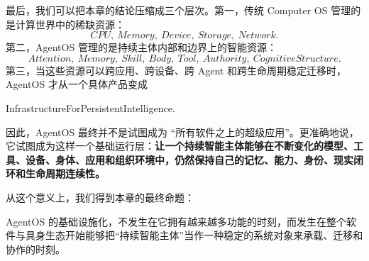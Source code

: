 最后，我们可以把本章的结论压缩成三个层次。第一，传统 Computer OS 管理的是计算世界中的稀缺资源：
\[
\boxed{
CPU,\ Memory,\ Device,\ Storage,\ Network.
}
\]
第二，AgentOS 管理的是持续主体内部和边界上的智能资源：
\[
\boxed{
Attention,\ Memory,\ Skill,\ Body,\ Tool,\ Authority,\ CognitiveStructure.
}
\]
第三，当这些资源可以跨应用、跨设备、跨 Agent 和跨生命周期稳定迁移时，AgentOS 才从一个具体产品变成
\begin{statementbox}
InfrastructureForPersistentIntelligence.
\end{statementbox}

因此，AgentOS 最终并不是试图成为 ``所有软件之上的超级应用''。更准确地说，它试图成为这样一个基础运行层：\textbf{让一个持续智能主体能够在不断变化的模型、工具、设备、身体、应用和组织环境中，仍然保持自己的记忆、能力、身份、现实闭环和生命周期连续性。}

从这个意义上，我们得到本章的最终命题：
\begin{proposition*}
AgentOS 的基础设施化，不发生在它拥有越来越多功能的时刻，而发生在整个软件与具身生态开始能够把“持续智能主体”当作一种稳定的系统对象来承载、迁移和协作的时刻。
\end{proposition*}
